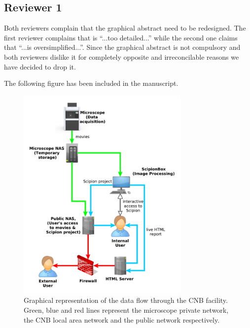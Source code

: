 \documentclass[a4paper,12pt]{article}
\date{06/09/18}
\def\cnb{CNB\xspace}
\def\cnb{CNB\xspace}
\begin{document}
\begin{reviewer}
\section*{Reviewer 1}

\reply  Both reviewers complain that the graphical abstract need to be redesigned. The first reviewer complains that is ``...too detailed...'' while the second one claims that ``...is oversimplified...''. Since the graphical abstract is not compulsory  and both reviewers dislike it for completely opposite and irreconcilable reasons we have decided to drop it.



\reply The following figure has been included in the manuscript. 

\begin{figure}
  \centering
      \includegraphics[width=0.75\textwidth]{images/diagram.pdf}
  \caption{Graphical representation of the data flow through the CNB facility. Green, blue and red lines represent the microscope private network, the \cnb local area network and the public network respectively.}
  \label{fig:cnbpipeline}


\end{figure}
\end{reviewer}
\end{document}
